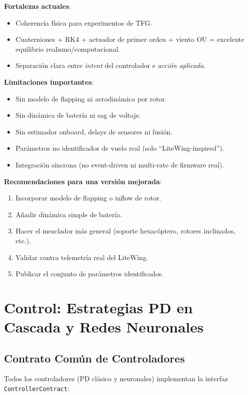 \documentclass[12pt,a4paper]{article}
\begin{document}
\textbf{Fortalezas actuales}:
\begin{itemize}
    \item Coherencia física para experimentos de TFG.
    \item Cuaterniones + RK4 + actuador de primer orden + viento OU = excelente equilibrio realismo/computacional.
    \item Separación clara entre \textit{intent} del controlador e \textit{acción aplicada}.
\end{itemize}

\textbf{Limitaciones importantes}:
\begin{itemize}
    \item Sin modelo de flapping ni aerodinámica por rotor.
    \item Sin dinámica de batería ni sag de voltaje.
    \item Sin estimador onboard, delays de sensores ni fusión.
    \item Parámetros no identificados de vuelo real (solo ``LiteWing-inspired'').
    \item Integración síncrona (no event-driven ni multi-rate de firmware real).
\end{itemize}

\textbf{Recomendaciones para una versión mejorada}:
\begin{enumerate}
    \item Incorporar modelo de flapping o inflow de rotor.
    \item Añadir dinámica simple de batería.
    \item Hacer el mezclador más general (soporte hexacóptero, rotores inclinados, etc.).
    \item Validar contra telemetría real del LiteWing.
    \item Publicar el conjunto de parámetros identificados.
\end{enumerate}

\section{Control: Estrategias PD en Cascada y Redes Neuronales}

\subsection{Contrato Común de Controladores}

Todos los controladores (PD clásico y neuronales) implementan la interfaz \texttt{ControllerContract}:
\end{document}
